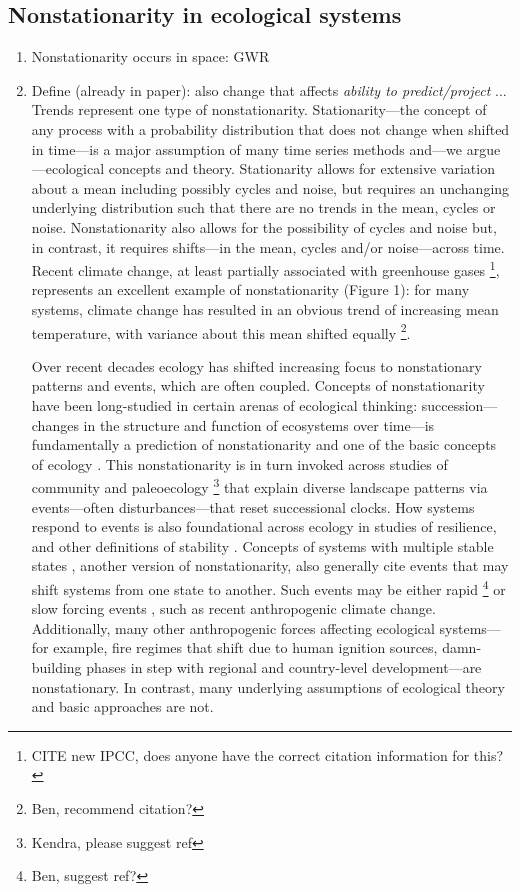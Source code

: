 \documentclass[11pt,a4paper,oneside]{article}
\begin{document}
\subsection{Nonstationarity in ecological systems}
\begin{enumerate}
\item Nonstationarity occurs in space: GWR
\item Define (already in paper): also change that affects \emph{ability to predict/project} ... Trends represent one type of nonstationarity. Stationarity---the concept of any process with a probability distribution that does not change when shifted in time---is a major assumption of many time series methods and---we argue---ecological concepts and theory. Stationarity allows for extensive variation about a mean including possibly cycles and noise, but requires an unchanging underlying distribution such that there are no trends in the mean, cycles or noise. Nonstationarity also allows for the possibility of cycles and noise but, in contrast, it requires shifts---in the mean, cycles and/or noise---across time. Recent climate change, at least partially associated with greenhouse gases \footnote{CITE new IPCC, does anyone have the correct citation information for this?}, represents an excellent example of nonstationarity (Figure 1): for many systems, climate change has resulted in an obvious trend of increasing mean temperature, with variance about this mean shifted equally \footnote{Ben, recommend citation?}. 

Over recent decades ecology has shifted increasing focus to nonstationary patterns and events, which are often coupled. Concepts of nonstationarity have been long-studied in certain arenas of ecological thinking: succession---changes in the structure and function of ecosystems over time---is fundamentally a prediction of nonstationarity and one of the basic concepts of ecology \citep{clementsbook,gleason1926}. This nonstationarity is in turn invoked across studies of community \citep{Levin:1992rg} and paleoecology \footnote{Kendra, please suggest ref} that explain diverse landscape patterns via events---often disturbances---that reset successional clocks. How systems respond to events is also foundational across ecology in studies of resilience, and other definitions of stability \citep{Grimm:1997}. Concepts of systems with multiple stable states \citep{yang2010}, another version of nonstationarity, also generally cite events that may shift systems from one state to another. Such events may be either rapid \footnote{Ben, suggest ref?} or slow forcing events \citep{Foley2003}, such as recent anthropogenic climate change. Additionally, many other anthropogenic forces affecting ecological systems---for example, fire regimes that shift due to human ignition sources, damn-building phases in step with regional and country-level development---are nonstationary. In contrast, many underlying assumptions of ecological theory and basic approaches are not.\\



\end{enumerate}
\end{document}
